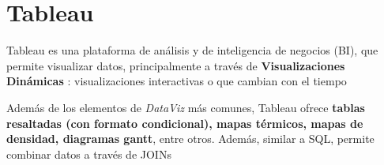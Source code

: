 
\section{Tableau}
Tableau es una plataforma de análisis y de inteligencia de negocios (BI), que permite visualizar datos, principalmente a través de \textbf{Visualizaciones Dinámicas} : visualizaciones interactivas o que cambian con el tiempo

Además de los elementos de \textit{DataViz} más comunes, Tableau ofrece \textbf{tablas resaltadas (con formato condicional), mapas térmicos, mapas de densidad, diagramas gantt}, entre otros. Además, similar a SQL, permite combinar datos a través de JOINs